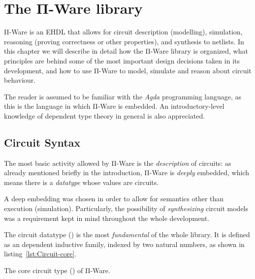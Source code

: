 \chapter{The Π-Ware library}
\label{chap:piware}

    Π-Ware is an \ac{EHDL} that allows for circuit description (modelling),
    simulation, reasoning (proving correctness or other properties), and synthesis to netlists.
    In this chapter we will describe in detail how the Π-Ware library is organized,
    what principles are behind some of the most important design decisions taken in its development,
    and how to use Π-Ware to model, simulate and reason about circuit behaviour.

    The reader is assumed to be familiar with the \emph{Agda} programming language,
    as this is the language in which Π-Ware is embedded.
    An introductory-level knowledge of dependent type theory in general is also appreciated.


    \section{Circuit Syntax}
    \label{sec:circuit-syntax}

        The most basic activity allowed by Π-Ware is the \emph{description} of circuits:
        as already mentioned briefly in the introduction, Π-Ware is \emph{deeply} embedded,
        which means there is a \emph{datatype} whose values are circuits.

        A deep embedding was chosen in order to allow for semantics other than execution (simulation).
        Particularly, the possibility of \emph{synthesizing} circuit models was a requirement
        kept in mind throughout the whole development.

        The circuit datatype () is the most \emph{fundamental} of the whole library.
        It is defined as an dependent inductive family, indexed by two natural numbers,
        as shown in listing~\ref{lst:Circuit-core}.

        \begin{listing}[h]
            \caption{The core circuit type () of Π-Ware. \label{lst:Circuit-core}}
        \end{listing}

